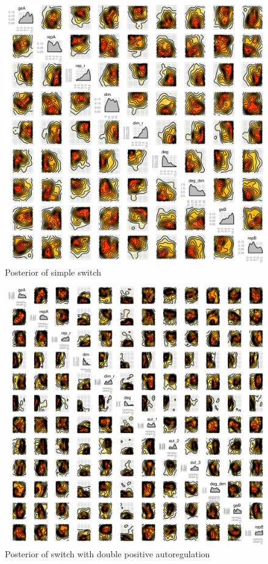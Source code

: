 \begin{figure}[htbp]
\begin{center}
\includegraphics[scale=0.15]{chapterModelling/mass_action_switches/bi_stoch_images/posterior_std.png}
\caption{Posterior of simple switch}\label{fig_6}
\end{center}
\end{figure}

\begin{figure}[htbp]
\begin{center}
\includegraphics[scale=0.15]{chapterModelling/mass_action_switches/bi_tri_same_priors/posterior_pos_ab_bi.png}
\caption{Posterior of switch with double positive autoregulation}\label{fig_7}
\end{center}
\end{figure}


